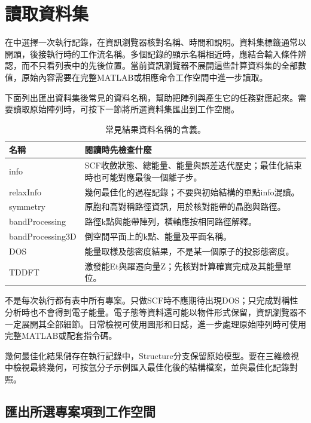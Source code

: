 \section{讀取資料集}\label{sec:read-dataset}

在中選擇一次執行記錄，在資訊瀏覽器核對名稱、時間和說明。資料集標籤通常以開頭，後接執行時的工作流名稱。多個記錄的顯示名稱相近時，應結合輸入條件辨認，而不只看列表中的先後位置。當前資訊瀏覽器不展開這些計算資料集的全部數值，原始內容需要在完整MATLAB\regmark{}或相應命令工作空間中進一步讀取。

下面列出匯出資料集後常見的資料名稱，幫助把陣列與產生它的任務對應起來。需要讀取原始陣列時，可按下一節將所選資料集匯出到工作空間。

\begin{table}[htbp]
\centering
\caption{常見結果資料名稱的含義。}
\begin{tabularx}{\linewidth}{lX}
\toprule
名稱 & 閱讀時先檢查什麼 \\
\midrule
info & SCF收斂狀態、總能量、能量與誤差迭代歷史；最佳化結束時也可能對應最後一個離子步。 \\
relaxInfo & 幾何最佳化的過程記錄；不要與初始結構的單點info混讀。 \\
symmetry & 原胞和高對稱路徑資訊，用於核對能帶的晶胞與路徑。 \\
bandProcessing & 路徑k點與能帶陣列，橫軸應按相同路徑解釋。 \\
bandProcessing3D & 倒空間平面上的k點、能量及平面名稱。 \\
DOS & 能量取樣及態密度結果，不是某一個原子的投影態密度。 \\
TDDFT & 激發能Et與躍遷向量Z；先核對計算確實完成及其能量單位。 \\
\bottomrule
\end{tabularx}
\end{table}

不是每次執行都有表中所有專案。只做SCF時不應期待出現DOS；只完成對稱性分析時也不會得到電子能量。電子態等資料還可能以物件形式保留，資訊瀏覽器不一定展開其全部細節。日常檢視可使用圖形和日誌，進一步處理原始陣列時可使用完整MATLAB\regmark{}或配套指令碼。

幾何最佳化結果儲存在執行記錄中，Structure分支保留原始模型。要在三維檢視中檢視最終幾何，可按氫分子示例匯入最佳化後的結構檔案，並與最佳化記錄對照。

\subsection{匯出所選專案項到工作空間}

